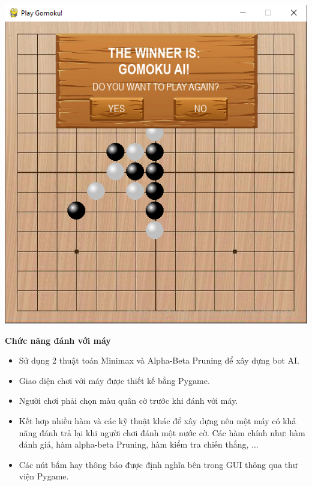 \documentclass[a4paper]{article}
\begin{document}
\begin{center}
\includegraphics{images/gomoku_AI.png} \\
\end{center}
\textbf{Chức năng đánh với máy}
\begin{itemize}
    \item Sử dụng 2 thuật toán Minimax và Alpha-Beta Pruning để xây dựng bot AI.
    \item Giao diện chơi với máy được thiết kế bằng Pygame.
    \item Người chơi phải chọn màu quân cờ trước khi đánh với máy.
    \item Kết hơp nhiều hàm và các kỹ thuật khác để xây dựng nên một máy có khả năng đánh trả lại khi người chơi đánh một nước cờ. Các hàm chính như: hàm đánh giá, hàm alpha-beta Pruning, hàm kiểm tra chiến thắng, ...
    \item Các nút bấm hay thông báo được định nghĩa bên trong GUI thông qua thư viện Pygame.
\end{itemize}
\end{document}

